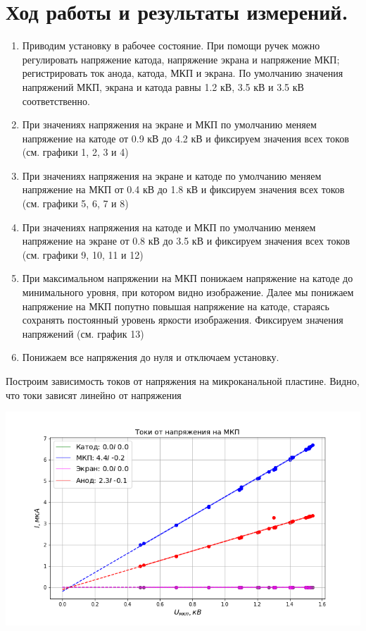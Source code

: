 \documentclass[a4paper,12pt]{article}
\theoremstyle{plain} %
\theoremstyle{definition} %
\theoremstyle{remark} %
\begin{document}
	\section{Ход работы и результаты измерений.}
\begin{enumerate}
    \item Приводим установку в рабочее состояние. При помощи ручек можно регулировать напряжение катода, напряжение экрана и напряжение МКП; регистрировать ток анода, катода, МКП и экрана. По умолчанию значения напряжений МКП, экрана и катода равны 1.2 кВ, 3.5 кВ и 3.5 кВ соответственно.
    \item При значениях напряжения на экране и МКП по умолчанию меняем напряжение на катоде от 0.9 кВ до 4.2 кВ и фиксируем значения всех токов (см. графики 1, 2, 3 и 4)
    \item  При значениях напряжения на экране и катоде по умолчанию меняем напряжение на МКП от 0.4 кВ до 1.8 кВ и фиксируем значения всех токов (см. графики 5, 6, 7 и 8)
    \item При значениях напряжения на катоде и МКП по умолчанию меняем напряжение на экране от 0.8 кВ до 3.5 кВ и фиксируем значения всех токов (см. графики 9, 10, 11 и 12)
    \item При максимальном напряжении на МКП понижаем напряжение на катоде до минимального уровня, при котором видно изображение. Далее мы понижаем напряжение на  МКП попутно повышая напряжение на катоде, стараясь сохранять постоянный уровень яркости изображения. Фиксируем значения напряжений (см. график 13)
    \item Понижаем все напряжения до нуля и отключаем установку.
\end{enumerate}

\break 

Построим зависимость токов от напряжения на микроканальной пластине. Видно, что токи зависят линейно от напряжения

\begin{center}
    \includegraphics[scale = 0.55]{I_V_MKP.png}
\end{center}
\end{document}

